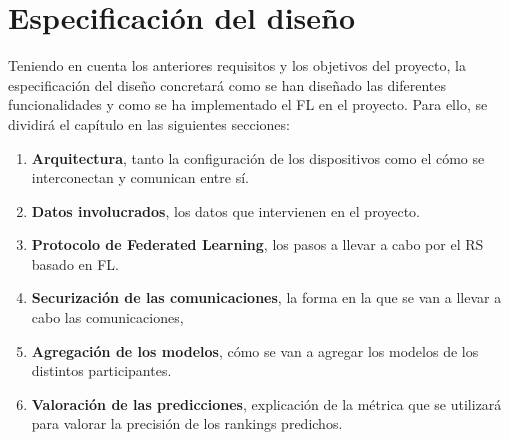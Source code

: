 \section{Especificación del diseño}
Teniendo en cuenta los anteriores requisitos y los objetivos del proyecto, la especificación del diseño concretará como se han diseñado las diferentes funcionalidades y como se ha implementado el FL en el proyecto. Para ello, se dividirá el capítulo en las siguientes secciones: 

\begin{enumerate}
    \item \textbf{Arquitectura}, tanto la configuración de los dispositivos como el cómo se interconectan y comunican entre sí.  
    \item \textbf{Datos involucrados}, los datos que intervienen en el proyecto. 
    \item \textbf{Protocolo de Federated Learning}, los pasos a llevar a cabo por el RS basado en FL.
    \item \textbf{Securización de las comunicaciones}, la forma en la que se van a llevar a cabo las comunicaciones,
    \item \textbf{Agregación de los modelos}, cómo se van a agregar los modelos de los distintos participantes.
    \item \textbf{Valoración de las predicciones}, explicación de la métrica que se utilizará para valorar la precisión de los rankings predichos.
\end{enumerate}

\newpage

\newpage

\newpage

\newpage

\newpage

\newpage
